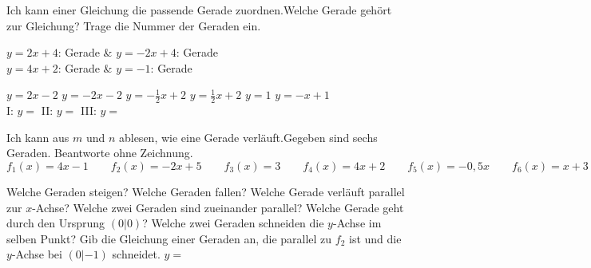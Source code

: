 \begin{aufgabe}{Ich kann einer Gleichung die passende Gerade zuordnen.\newline Welche Gerade gehört zur Gleichung? Trage die Nummer der Geraden ein.}

\begin{ksys}[xmin=-4,xmax=4,ymin=-4,ymax=7,ablesen]
\end{ksys}\ksysabstand\begin{ksys}[xmin=-4,xmax=4,ymin=-4,ymax=7,ablesen]
\end{ksys}

\begin{teilezwei}
\tz $y = 2x + 4$: \quad Gerade \leerfeld & \tz $y = -2x + 4$: \quad Gerade \leerfeld \\
\tz $y = 4x + 2$: \quad Gerade \leerfeld & \tz $y = -1$: \quad Gerade \leerfeld \\
\end{teilezwei}
\begin{teile}
\teil $y = 2x - 2$ \quad $y = -2x - 2$ \quad $y = -\frac{1}{2}x + 2$ \quad $y = \frac{1}{2}x + 2$ \quad $y = 1$ \quad $y = -x + 1$ \\[1mm]
I: $y = $ \leerfeld \quad II: $y = $ \leerfeld \quad III: $y = $ \leerfeld
\end{teile}
\end{aufgabe}


\begin{aufgabe}{Ich kann aus $m$ und $n$ ablesen, wie eine Gerade verläuft.\newline Gegeben sind sechs Geraden. Beantworte ohne Zeichnung.}
\[ f_1(x) = 4x - 1 \qquad f_2(x) = -2x + 5 \qquad f_3(x) = 3 \qquad f_4(x) = 4x + 2 \qquad f_5(x) = -0{,}5x \qquad f_6(x) = x + 3 \]
\begin{teile}
\teil Welche Geraden steigen? \quad \leerfeld
\teil Welche Geraden fallen? \quad \leerfeld
\teil Welche Gerade verläuft parallel zur $x$-Achse? \quad \leerfeld
\teil Welche zwei Geraden sind zueinander parallel? \quad \leerfeld
\teil Welche Gerade geht durch den Ursprung $(0|0)$? \quad \leerfeld
\teil Welche zwei Geraden schneiden die $y$-Achse im selben Punkt? \quad \leerfeld
\teil Gib die Gleichung einer Geraden an, die parallel zu $f_2$ ist und die $y$-Achse bei $(0|{-1})$ schneidet. \quad $y = $ \leerfeld
\end{teile}
\end{aufgabe}


